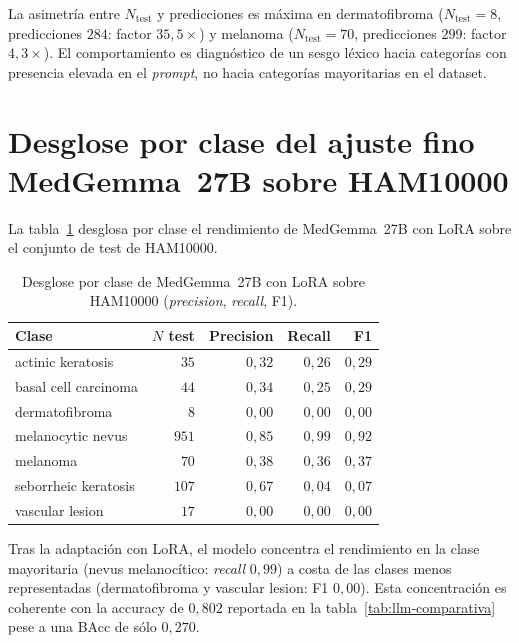 La asimetría entre $N_{\mathrm{test}}$ y predicciones es máxima en
dermatofibroma ($N_{\mathrm{test}} = 8$, predicciones $284$:
factor $35{,}5\times$) y melanoma ($N_{\mathrm{test}} = 70$,
predicciones $299$: factor $4{,}3\times$). El comportamiento es
diagnóstico de un sesgo léxico hacia categorías con presencia
elevada en el \emph{prompt}, no hacia categorías mayoritarias en el
dataset.

\section{Desglose por clase del ajuste fino MedGemma~27B sobre HAM10000}
\label{sec:anexob-medgemma}

La tabla~\ref{tab:anexob-medgemma} desglosa por clase el rendimiento
de MedGemma~27B con LoRA sobre el conjunto de test de HAM10000.

\begin{table}[H]
\centering
\footnotesize
\setlength{\tabcolsep}{4pt}
\renewcommand{\arraystretch}{0.95}
\caption{Desglose por clase de MedGemma~27B con LoRA sobre
HAM10000 (\emph{precision}, \emph{recall}, F1).}
\label{tab:anexob-medgemma}
\begin{tabular}{lrrrr}
\hline
Clase                       & $N$ test & Precision & Recall    & F1 \\
\hline
actinic keratosis           & $35$     & $0{,}32$  & $0{,}26$  & $0{,}29$ \\
basal cell carcinoma        & $44$     & $0{,}34$  & $0{,}25$  & $0{,}29$ \\
dermatofibroma              & $8$      & $0{,}00$  & $0{,}00$  & $0{,}00$ \\
melanocytic nevus           & $951$    & $0{,}85$  & $0{,}99$  & $0{,}92$ \\
melanoma                    & $70$     & $0{,}38$  & $0{,}36$  & $0{,}37$ \\
seborrheic keratosis        & $107$    & $0{,}67$  & $0{,}04$  & $0{,}07$ \\
vascular lesion             & $17$     & $0{,}00$  & $0{,}00$  & $0{,}00$ \\
\hline
\end{tabular}
\end{table}

Tras la adaptación con LoRA, el modelo concentra el rendimiento en
la clase mayoritaria (nevus melanocítico: \emph{recall}
$0{,}99$) a costa de las clases menos representadas
(dermatofibroma y vascular lesion: F1 $0{,}00$). Esta
concentración es coherente con la accuracy de $0{,}802$
reportada en la tabla~\ref{tab:llm-comparativa} pese a una BAcc
de sólo $0{,}270$.

